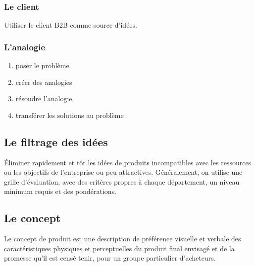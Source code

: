 			\subsubsection{Le client}
			
			Utiliser le client B2B comme source d'idées.
			
			
			
			\subsubsection{L'analogie}
			
			\begin{enumerate}
				\item poser le problème
				\item créer des analogies
				\item résoudre l'analogie
				\item transférer les solutions au problème
			\end{enumerate}
			
			
			
		\subsection{Le filtrage des idées}
		
		Éliminer rapidement et tôt les idées de produits incompatibles avec les ressources ou les objectifs de l'entreprise ou peu attractives. Généralement, on utilise une grille d'évaluation, avec des critères propres à chaque département, un niveau minimum requis et des pondérations.
		
\begin{comment}
		\begin{enumerate}
			\item grille d'évaluation (critères propres à chaque département ; niveau minimal requis ; pondérations)
			\item évaluations des idées ...
			\item ...
			\item ...
		\end{enumerate}
\end{comment}

		\subsection{Le concept}
				
		Le concept de produit est une description de préférence visuelle et verbale des caractéristiques physiques et perceptuelles du produit final envisagé et de la promesse qu'il est censé tenir, pour un groupe particulier d'acheteurs.
			
